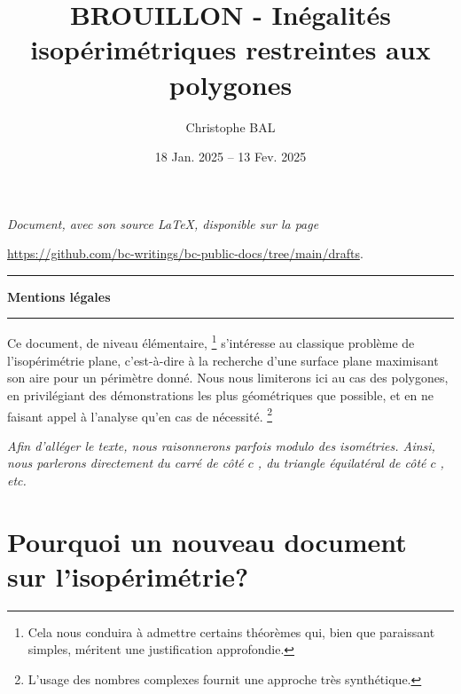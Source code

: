\documentclass[12pt]{amsart}
\begin{document}
\title{BROUILLON - Inégalités isopérimétriques restreintes aux polygones}
\author{Christophe BAL}
\date{18 Jan. 2025 -- 13 Fev. 2025}

\maketitle

\begin{center}
	\itshape
	Document, avec son source \LaTeX, disponible sur la page

	\url{https://github.com/bc-writings/bc-public-docs/tree/main/drafts}.
\end{center}


\bigskip


\begin{center}
	\hrule\vspace{.3em}
	{
		\fontsize{1.35em}{1em}\selectfont
		\textbf{Mentions \og légales \fg}
	}
			
	\vspace{0.45em}
	\doclicenseThis
	\hrule
\end{center}



\setcounter{tocdepth}{2}
\tableofcontents




\newpage

Ce document, de niveau élémentaire,%
\footnote{
    Cela nous conduira à admettre certains théorèmes qui, bien que paraissant simples, méritent une justification approfondie.
}
s'intéresse au classique problème de l'isopérimétrie plane, c'est-à-dire à la recherche d'une surface plane maximisant son aire pour un périmètre donné.
Nous nous limiterons ici au cas des polygones, en privilégiant des démonstrations les plus géométriques que possible, et en ne faisant appel à l'analyse qu'en cas de nécessité.%
\footnote{
    L'usage des nombres complexes fournit une approche très synthétique.
}


\begin{tcolorbox}
    \itshape\small
    Afin d'alléger le texte, nous raisonnerons parfois modulo des isométries. Ainsi, nous parlerons directement du \og carré de côté \( c \) \fg, du \og triangle équilatéral de côté \( c \) \fg, etc.
\end{tcolorbox}




\section{Pourquoi un  nouveau document sur l'isopérimétrie?}

\end{document}
